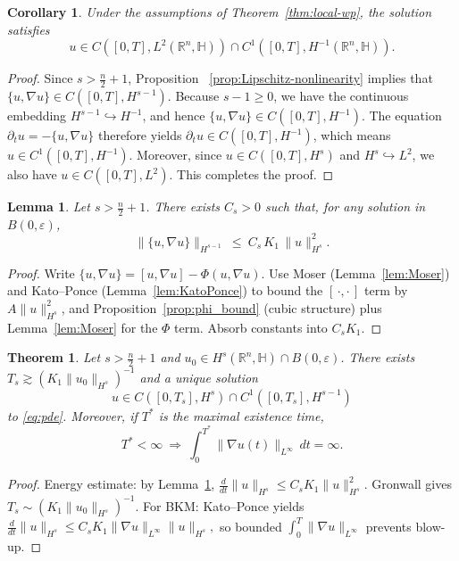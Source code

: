 \documentclass[10pt]{amsart}
\numberwithin{equation}{section}
\newtheorem{thm}[theorem]{Theorem}
\newtheorem{lem}[theorem]{Lemma}
\newtheorem{cor}[theorem]{Corollary}
\theoremstyle{remark}
\theoremstyle{definition}
\begin{document}
\begin{cor}\label{cor:weak-reg}
Under the assumptions of Theorem~\ref{thm:local-wp}, the solution satisfies
\[
u \in C([0,T],L^2(\mathbb R^n,\mathbb H))
\cap C^1([0,T],H^{-1}(\mathbb R^n,\mathbb H)).
\]
\end{cor}

\begin{proof}
Since $s > \frac{n}{2} + 1$, Proposition ~\ref{prop:Lipschitz-nonlinearity} implies that $\{u, \nabla u\} \in C([0, T], H^{s-1})$. Because $s - 1 \geq 0$, we have the continuous embedding $H^{s-1} \hookrightarrow H^{-1}$, and hence $\{u, \nabla u\} \in C([0, T], H^{-1})$. The equation $\partial_t u = -\{u, \nabla u\}$ therefore yields $\partial_t u \in C([0, T], H^{-1})$, which means $u \in C^1([0, T], H^{-1})$. Moreover, since $u \in C([0, T], H^s)$ and $H^s \hookrightarrow L^2$, we also have $u \in C([0, T], L^2)$. This completes the proof.
\end{proof}


\begin{lem}\label{lem:tame}
Let $s>\tfrac n2+1$. There exists $C_s>0$ such that, for any solution in $B(0,\varepsilon)$,
\[
\|\{u,\nabla u\}\|_{H^{s-1}}\ \le\ C_s\,K_1\,\|u\|_{H^s}^2.
\]
\end{lem}

\begin{proof}
Write $\{u,\nabla u\}=[u,\nabla u]-\Phi(u,\nabla u)$.
Use Moser (Lemma~\ref{lem:Moser}) and Kato--Ponce (Lemma~\ref{lem:KatoPonce}) to bound the $[\,\cdot,\cdot\,]$ term by $A\|u\|_{H^s}^2$,
and Proposition~\ref{prop:phi_bound} (cubic structure) plus Lemma~\ref{lem:Moser} for the $\Phi$ term.
Absorb constants into $C_s K_1$.
\end{proof}

\begin{thm}\label{thm:persistence}
Let $s>\tfrac n2+1$ and $u_0\in H^s(\mathbb R^n,\mathbb H)\cap B(0,\varepsilon)$.
There exists $T_s\gtrsim (K_1\|u_0\|_{H^s})^{-1}$ and a unique solution
\[
u\in C([0,T_s],H^s)\cap C^1([0,T_s],H^{s-1})
\]
to \eqref{eq:pde}. Moreover, if $T^*$ is the maximal existence time,
\[
T^*<\infty\ \Longrightarrow\ \int_0^{T^*}\|\nabla u(t)\|_{L^\infty}\,dt=\infty.
\]
\end{thm}

\begin{proof}
Energy estimate: by Lemma~\ref{lem:tame},
\(
\frac{d}{dt}\|u\|_{H^s}\le C_s K_1 \|u\|_{H^s}^2.
\)
Gronwall gives $T_s\sim (K_1\|u_0\|_{H^s})^{-1}$.
For BKM: Kato--Ponce yields
\(
\frac{d}{dt}\|u\|_{H^s}\le C_s K_1 \|\nabla u\|_{L^\infty}\|u\|_{H^s},
\)
so bounded $\int_0^T \|\nabla u\|_{L^\infty}$ prevents blow-up.
\end{proof}
\end{document}
